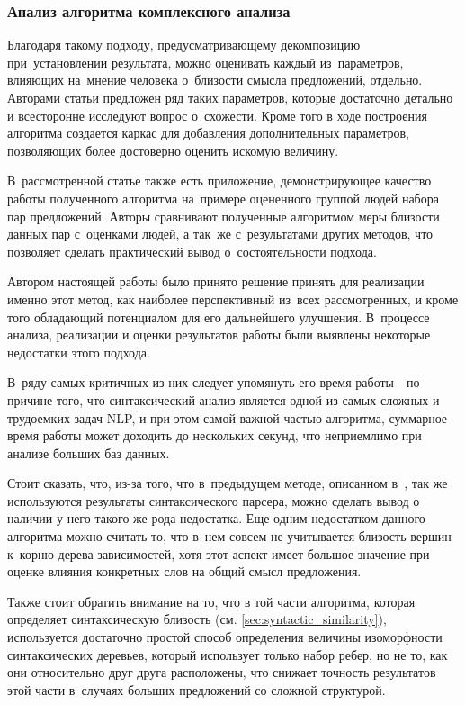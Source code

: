 \subsubsection{Анализ алгоритма комплексного анализа}
\label{sec:complex_algorithm_analysis}
Благодаря такому подходу, предусматривающему декомпозицию при~установлении результата, 
можно оценивать каждый из~параметров, влияющих на~мнение человека о~близости смысла предложений, отдельно. 
Авторами статьи предложен ряд таких параметров, 
которые достаточно детально и всесторонне исследуют вопрос о~схожести. Кроме того
в ходе построения алгоритма создается каркас для добавления дополнительных параметров,
позволяющих более достоверно оценить искомую величину. 

В~рассмотренной статье\cite{complexSim} также есть приложение, демонстрирующее качество работы
полученного алгоритма на~примере оцененного группой людей набора пар предложений.
Авторы сравнивают полученные алгоритмом меры близости данных пар с~оценками людей, 
а так~же с~результатами других методов, что позволяет сделать практический вывод
о~состоятельности подхода.

Автором настоящей работы было принято решение принять для реализации именно этот метод,
как наиболее перспективный из~всех рассмотренных, и кроме того обладающий
потенциалом для его дальнейшего улучшения.
В~процессе анализа, реализации и оценки результатов работы были выявлены
некоторые недостатки этого подхода.

В~ряду самых критичных из них следует упомянуть его время работы - 
по причине того, что синтаксический анализ является одной из самых
сложных и трудоемких задач NLP, и при этом самой важной частью алгоритма,
суммарное время работы может доходить до нескольких секунд,
что неприемлимо при анализе больших баз данных.

Стоит сказать, что, из-за того, что в~предыдущем методе, описанном в~\cite{weightedDep},
так же используются результаты синтаксического парсера, можно сделать вывод
о наличии у него такого же рода недостатка.
Еще одним недостатком данного алгоритма можно считать то, что в~нем совсем
не учитывается близость вершин к~корню дерева зависимостей, хотя этот аспект
имеет большое значение при оценке влияния конкретных слов на общий смысл
предложения.

Также стоит обратить внимание на то, что в той части алгоритма, 
которая определяет синтаксическую близость (см. \ref{sec:syntactic_similarity}),
используется достаточно простой способ определения величины изоморфности
синтаксических деревьев, который использует только набор ребер, но не то,
как они относительно друг друга расположены, что снижает точность
результатов этой части в~случаях больших предложений со сложной структурой.


